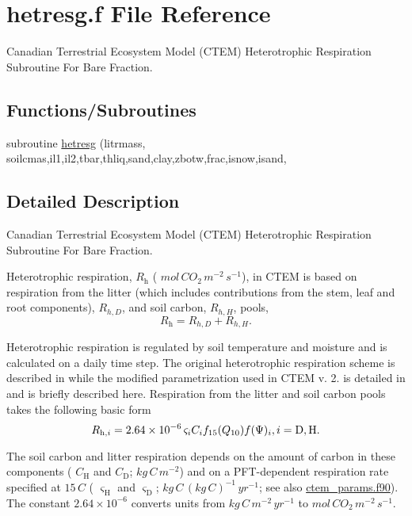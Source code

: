 \hypertarget{hetresg_8f}{}\section{hetresg.\+f File Reference}
\label{hetresg_8f}


Canadian Terrestrial Ecosystem Model (C\+T\+E\+M) Heterotrophic Respiration Subroutine For Bare Fraction.  


\subsection*{Functions/\+Subroutines}
\begin{DoxyCompactItemize}
\item 
subroutine \hyperlink{hetresg_8f_abc05c909fea03987862d6cf0dd3c5a0c}{hetresg} (litrmass, soilcmas,il1,il2,tbar,thliq,sand,clay,zbotw,frac,isnow,isand,
\end{DoxyCompactItemize}


\subsection{Detailed Description}
Canadian Terrestrial Ecosystem Model (C\+T\+E\+M) Heterotrophic Respiration Subroutine For Bare Fraction. 

Heterotrophic respiration, $R_\mathrm{h}$ ( $mol\,CO_2\,m^{-2}\,s^{-1}$), in C\+T\+E\+M is based on respiration from the litter (which includes contributions from the stem, leaf and root components), $R_{h,D}$, and soil carbon, $R_{h,H}$, pools, \[ \label{hetres_all} R_\mathrm{h}=R_{h,D}+R_{h,H}. \]

Heterotrophic respiration is regulated by soil temperature and moisture and is calculated on a daily time step. The original heterotrophic respiration scheme is described in \cite{Arora2003-3b7} while the modified parametrization used in C\+T\+E\+M v. 2. is detailed in \cite{Melton2014-xy} and is briefly described here. Respiration from the litter and soil carbon pools takes the following basic form \[ R_{\mathrm{h},i} = 2.64 \times 10^{-6}\,\varsigma_i C_i f_{15}(Q_{10}) f(\Psi)_i,\nonumber \\ i = \mathrm{D}, \mathrm{H}.\label{lithet} \]

The soil carbon and litter respiration depends on the amount of carbon in these components ( $C_\mathrm{H}$ and $C_\mathrm{D}$; $kg\,C\,m^{-2}$) and on a P\+F\+T-\/dependent respiration rate specified at $15\,{C}$ ( $\varsigma_\mathrm{H}$ and $\varsigma_\mathrm{D}$; $kg\,C\,(kg\,C)^{-1}\,yr^{-1}$; see also \hyperlink{ctem__params_8f90}{ctem\+\_\+params.\+f90}). The constant $2.64 \times 10^{-6}$ converts units from $kg\,C\,m^{-2}\,yr^{-1}$ to $mol\,CO_2\,m^{-2}\,s^{-1}$.

